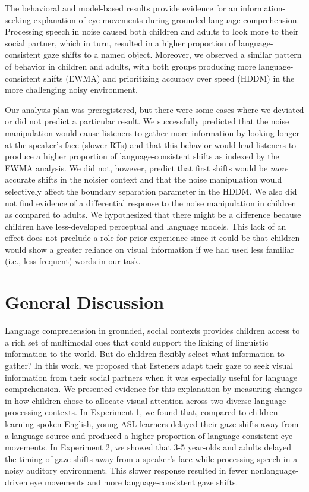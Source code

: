 \documentclass[,man,floatsintext]{apa6}
\begin{document}
The behavioral and model-based results provide evidence for an information-seeking explanation of eye movements during grounded language comprehension. Processing speech in noise caused both children and adults to look more to their social partner, which in turn, resulted in a higher proportion of language-consistent gaze shifts to a named object. Moreover, we observed a similar pattern of behavior in children and adults, with both groups producing more language-consistent shifts (EWMA) and prioritizing accuracy over speed (HDDM) in the more challenging noisy environment.

Our analysis plan was preregistered, but there were some cases where we deviated or did not predict a particular result. We successfully predicted that the noise manipulation would cause listeners to gather more information by looking longer at the speaker's face (slower RTs) and that this behavior would lead listeners to produce a higher proportion of language-consistent shifts as indexed by the EWMA analysis. We did not, however, predict that first shifts would be \emph{more} accurate shifts in the noisier context and that the noise manipulation would selectively affect the boundary separation parameter in the HDDM. We also did not find evidence of a differential response to the noise manipulation in children as compared to adults. We hypothesized that there might be a difference because children have less-developed perceptual and language models. This lack of an effect does not preclude a role for prior experience since it could be that children would show a greater reliance on visual information if we had used less familiar (i.e., less frequent) words in our task.

\hypertarget{general-discussion}{%
\section{General Discussion}\label{general-discussion}}

Language comprehension in grounded, social contexts provides children access to a rich set of multimodal cues that could support the linking of linguistic information to the world. But do children flexibly select what information to gather? In this work, we proposed that listeners adapt their gaze to seek visual information from their social partners when it was especially useful for language comprehension. We presented evidence for this explanation by measuring changes in how children chose to allocate visual attention across two diverse language processing contexts. In Experiment 1, we found that, compared to children learning spoken English, young ASL-learners delayed their gaze shifts away from a language source and produced a higher proportion of language-consistent eye movements. In Experiment 2, we showed that 3-5 year-olds and adults delayed the timing of gaze shifts away from a speaker's face while processing speech in a noisy auditory environment. This slower response resulted in fewer nonlanguage-driven eye movements and more language-consistent gaze shifts.
\end{document}
